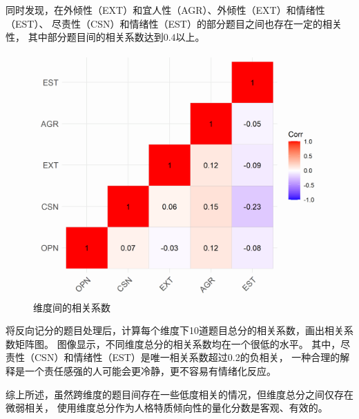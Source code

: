 \documentclass[UTF8]{ctexart}
\begin{document}
同时发现，在外倾性（EXT）和宜人性（AGR）、外倾性（EXT）和情绪性（EST）、
尽责性（CSN）和情绪性（EST）的部分题目之间也存在一定的相关性，
其中部分题目间的相关系数达到$0.4$以上。\par
\begin{figure}[H]
  \centering
  \includegraphics[scale=0.7]{Corrplot_Dimension.png}
  \caption{维度间的相关系数}
\end{figure}
将反向记分的题目处理后，计算每个维度下10道题目总分的相关系数，画出相关系数矩阵图。
图像显示，不同维度总分的相关系数均在一个很低的水平。
其中，尽责性（CSN）和情绪性（EST）是唯一相关系数超过0.2的负相关，
一种合理的解释是一个责任感强的人可能会更冷静，更不容易有情绪化反应。\par
综上所述，虽然跨维度的题目间存在一些低度相关的情况，但维度总分之间仅存在微弱相关，
使用维度总分作为人格特质倾向性的量化分数是客观、有效的。
\end{document}

